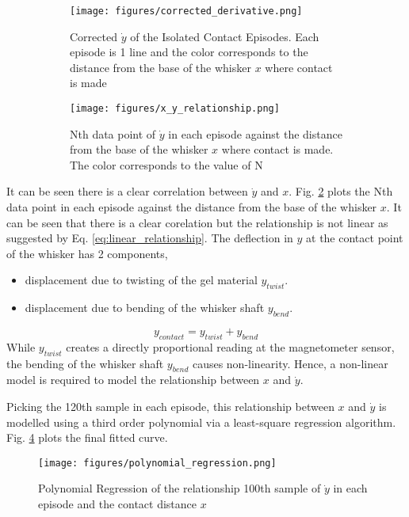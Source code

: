 \documentclass[runningheads]{llncs}
\begin{document}
\begin{figure}
    \centering
    \begin{subfigure}[t]{.48\textwidth}
        \centering
        \texttt{[image: figures/corrected\_derivative.png]}
        \caption{Corrected \(\dot{y}\) of the Isolated Contact Episodes. Each episode is 1 line and the color corresponds to the distance from the base of the whisker \(x\) where contact is made}
        \label{fig:corrected_derivative.png}
    \end{subfigure}
    \hspace{1mm}
    \begin{subfigure}[t]{.48\textwidth}
        \centering
        \texttt{[image: figures/x\_y\_relationship.png]}
        \caption{Nth data point of \(\dot{y}\) in each episode against the distance from the base of the whisker \(x\) where contact is made. The color corresponds to the value of N}
        \label{fig:x_y_relationship.png}
    \end{subfigure}
    \caption{}
    \label{fig:episode_analysis}
\end{figure}

It can be seen there is a clear correlation between \(\dot{y}\) and \(x\). Fig. \ref*{fig:x_y_relationship.png} plots the Nth data point in each episode against the distance from the base of the whisker \(x\). It can be seen that there is a clear corelation but the relationship is not linear as suggested by Eq. \ref*{eq:linear_relationship}. The deflection in \(y\) at the contact point of the whisker has 2 components,
\begin{itemize}
    \item displacement due to twisting of the gel material \(y_{twist}\).
    \item displacement due to bending of the whisker shaft \(y_{bend}\).
\end{itemize}
\[y_{contact} = y_{twist} + y_{bend}\]
While \(y_{twist}\) creates a directly proportional reading at the magnetometer sensor, the bending of the whisker shaft \(y_{bend}\) causes non-linearity. Hence, a non-linear model is required to model the relationship between \(x\) and \(\dot{y}\).

Picking the 120th sample in each episode, this relationship between \(x\) and \(\dot{y}\) is modelled using a third order polynomial via a least-square regression algorithm. Fig. \ref*{fig:polynomial_regression.png} plots the final fitted curve.

\begin{figure}
    \centering
    \texttt{[image: figures/polynomial\_regression.png]}
    \caption{Polynomial Regression of the relationship 100th sample of \(\dot{y}\) in each episode and the contact distance \(x\)}
    \label{fig:polynomial_regression.png}
\end{figure}
\end{document}
